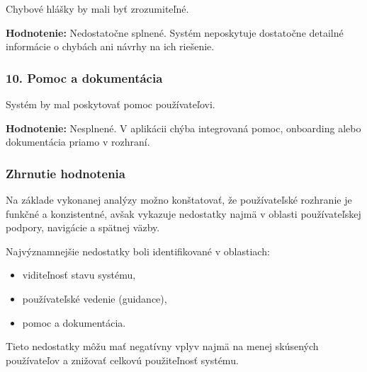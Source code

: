 Chybové hlášky by mali byť zrozumiteľné.

\textbf{Hodnotenie:} Nedostatočne splnené.  
Systém neposkytuje dostatočne detailné informácie o chybách ani návrhy na ich riešenie.

\subsubsection*{10. Pomoc a dokumentácia}

Systém by mal poskytovať pomoc používateľovi.

\textbf{Hodnotenie:} Nesplnené.  
V aplikácii chýba integrovaná pomoc, onboarding alebo dokumentácia priamo v rozhraní.

\subsubsection*{Zhrnutie hodnotenia}

Na základe vykonanej analýzy možno konštatovať, že používateľské rozhranie je funkčné a konzistentné, avšak vykazuje nedostatky najmä v oblasti používateľskej podpory, navigácie a spätnej väzby.

Najvýznamnejšie nedostatky boli identifikované v oblastiach:
\begin{itemize}
    \item viditeľnosť stavu systému,
    \item používateľské vedenie (guidance),
    \item pomoc a dokumentácia.
\end{itemize}

Tieto nedostatky môžu mať negatívny vplyv najmä na menej skúsených používateľov a znižovať celkovú použiteľnosť systému.
